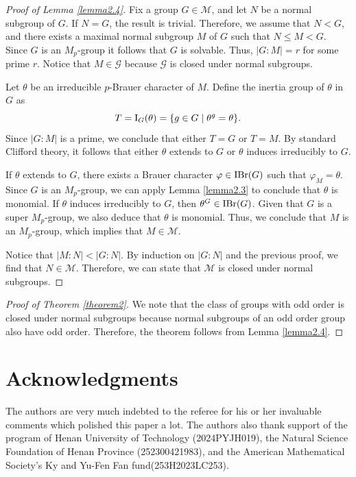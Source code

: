 \documentclass[12pt]{amsart}
\theoremstyle{remark}
\numberwithin{equation}{section}
\begin{document}
\begin{proof}[Proof of Lemma \ref{lemma2.4}]
Fix a group $G\in \mathcal{M}$, and let $N$ be a normal subgroup of $G$.
If $N=G$, the result is trivial. Therefore, we assume that $N<G$,
and there exists a maximal normal subgroup $M$ of $G$ such that $N\leq M<G$.
Since $G$ is an $M_{p}$-group it follows that $G$ is solvable.
Thus, $|G: M|=r$ for some prime $r$.
Notice that $M\in \mathcal{G}$ because $\mathcal{G}$ is closed under normal subgroups.


Let $\theta$ be an irreducible $p$-Brauer character of $M$. Define the inertia group of $\theta$ in $G$ as
$$T={\rm I}_{G}(\theta)=\{g\in G\mid \theta^{g}=\theta\}.$$ 
Since $|G: M|$ is a prime, we conclude that either $T=G$ or $T=M$.
By standard Clifford theory, it follows that either $\theta$ extends to $G$
or $\theta$ induces irreducibly to $G$.

If $\theta$ extends to $G$,
there exists a Brauer character $\varphi\in {\rm IBr}(G)$ such that $\varphi_{M}=\theta$.
Since $G$ is an $M_{p}$-group, we can apply Lemma \ref{lemma2.3} to conclude that $\theta$ is monomial.
If $\theta$ induces irreducibly to $G$, then $\theta^{G}\in {\rm IBr}(G)$.
Given that $G$ is a super $M_{p}$-group, we also deduce that $\theta$ is monomial.
Thus, we conclude that $M$ is an $M_{p}$-group, which implies that $M\in \mathcal{M}$.

Notice that $|M: N|<|G: N|$.
By induction on $|G: N|$ and the previous proof, we find that $N\in \mathcal{M}$.
Therefore, we can state that $\mathcal{M}$ is closed under normal subgroups.
\end{proof}


\begin{proof}[Proof of Theorem \ref{theorem2}]
We note that the class of groups with odd order is closed under normal subgroups
because normal subgroups of an odd order group also have odd order.
Therefore, the theorem follows from Lemma \ref{lemma2.4}.
\end{proof}


\section*{Acknowledgments}
The authors are very much indebted to the referee for his or her
invaluable comments which polished this paper a lot.
The authors also thank support of the program of Henan University of
Technology (2024PYJH019), the Natural Science Foundation of Henan
Province (252300421983), and the American Mathematical Society's Ky
and Yu-Fen Fan fund(253H2023LC253).
\end{document}
